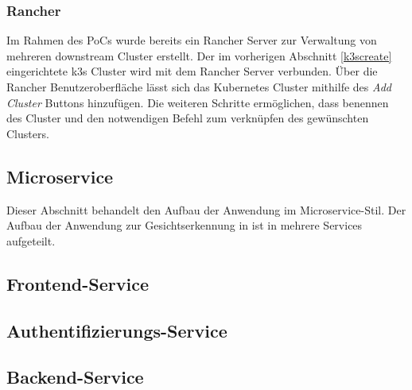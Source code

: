 \subsubsection{Rancher}
Im Rahmen des PoCs wurde bereits ein Rancher Server zur Verwaltung von mehreren downstream Cluster erstellt.
Der im vorherigen Abschnitt \ref{k3screate} eingerichtete k3s Cluster wird mit dem Rancher Server verbunden.
Über die Rancher Benutzeroberfläche lässt sich das Kubernetes Cluster mithilfe des \textit{Add Cluster} Buttons hinzufügen.
Die weiteren Schritte ermöglichen, dass benennen des Cluster und den notwendigen Befehl zum verknüpfen des gewünschten Clusters.

\subsection{Microservice}
Dieser Abschnitt behandelt den Aufbau der Anwendung im Microservice-Stil.
Der Aufbau der Anwendung zur Gesichtserkennung in ist in mehrere Services aufgeteilt.

\subsection{Frontend-Service}
\subsection{Authentifizierungs-Service}
\subsection{Backend-Service}




